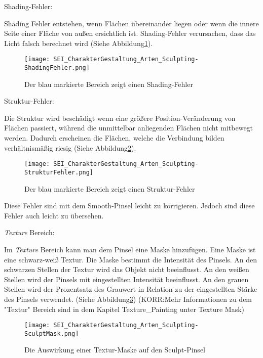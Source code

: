 Shading-Fehler:

Shading Fehler entstehen, wenn Flächen übereinander liegen oder wenn
die innere Seite einer Fläche von außen ersichtlich ist. Shading-Fehler
verursachen, dass das Licht falsch berechnet wird (Siehe Abbildung\ref{picture:shading_fehler}).

\begin{figure}[h]
    \centering
    \texttt{[image: SEI\_CharakterGestaltung\_Arten\_Sculpting-ShadingFehler.png]}
    \caption{Der blau markierte Bereich zeigt einen Shading-Fehler}
    \label{picture:shading_fehler}
\end{figure}


Struktur-Fehler:

Die Struktur wird beschädigt wenn eine größere Position-Veränderung von Flächen passiert, während die unmittelbar
anliegenden Flächen nicht mitbewegt werden. Dadurch erscheinen die Flächen, welche die Verbindung bilden
verhältnismäßig riesig (Siehe Abbildung\ref{picture:struktur_fehler}).

\begin{figure}[h]
    \centering
    \texttt{[image: SEI\_CharakterGestaltung\_Arten\_Sculpting-StrukturFehler.png]}
    \caption{Der blau markierte Bereich zeigt einen Struktur-Fehler}
    \label{picture:struktur_fehler}
\end{figure}



Diese Fehler sind mit dem Smooth-Pinsel leicht zu korrigieren.
Jedoch sind diese Fehler auch leicht zu übersehen.


\textit{Texture} Bereich\citep{blender:tex_mask}:

Im \textit{Texture} Bereich kann man dem Pinsel eine Maske hinzufügen. Eine Maske ist eine schwarz-weiß Textur.
Die Maske bestimmt die Intensität des Pinsels. An den schwarzen Stellen der Textur wird das Objekt nicht
beeinflusst. An den weißen Stellen wird der Pinsels mit eingestellten Intensität beeinflusst.
An den grauen Stellen wird der Prozentsatz des Grauwert in Relation zu der eingestellten
Stärke des Pinsels verwendet. (Siehe Abbildung\ref{picture:sculpt_tex_mask})
(KORR:Mehr Informationen zu dem "Textur" Bereich sind in dem Kapitel Texture_Painting unter Texture Mask)

\begin{figure}[h]
    \centering
    \texttt{[image: SEI\_CharakterGestaltung\_Arten\_Sculpting-SculptMask.png]}
    \caption{Die Auswirkung einer Textur-Maske auf den Sculpt-Pinsel}
    \label{picture:sculpt_tex_mask}
\end{figure}

